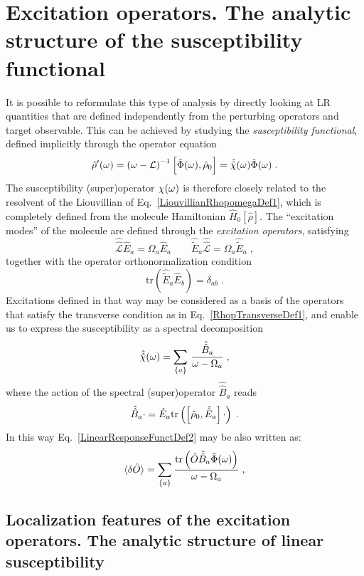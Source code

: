 \documentclass[reprint,aps,prb]{revtex4-1}
\newcommand{\be}{\begin{equation}}
\newcommand{\ee}{\end{equation}}
\newcommand{\nn}{\notag}
\newcommand{\qq}{\qquad}
\newcommand{\lb}{\label}
\newcommand{\op}[1]{\hat {#1}}
\newcommand{\sop}[1]{\op{\op {#1}}}
\newcommand{\commutator}[2]{\left[ {#1} , {#2} \right]}
\newcommand{\trace}[1]{\mathrm{tr}\left(#1\right)}
\newcommand{\dmnot}{\op{\rho}_0}
\newcommand{\dm}{\op{\rho}}
\newcommand{\hnot}{\op{H}_0}
\newcommand{\Liouv}{\sop{\mathcal L}}
\begin{document}
\section{Excitation operators. The analytic structure of the susceptibility functional}

It is possible to reformulate this type of analysis by directly looking at LR quantities that are defined independently from the perturbing operators and target observable. This can be achieved by studying the \emph{susceptibility functional}, defined implicitly through the operator equation
\be\lb{SusceptibilityDef1}
\dm'(\omega) = \left(\omega -\mathcal L \right)^{-1} \commutator{\op \Phi(\omega)}{\dmnot} = \sop{{\cal \chi}}(\omega) \op\Phi(\omega) \;.
\ee
The susceptibility (super)operator $\cal \chi(\omega)$ is therefore closely related to the resolvent of the Liouvillian of Eq.~\eqref{LiouvillianRhopomegaDef1}, which is completely defined
from the molecule Hamiltonian $\hnot[\dm]$.
The ``excitation modes''  of the molecule are defined through the \emph{excitation operators}, satisfying
\be\lb{ExcitationOperatorsDef1}
\Liouv \op E_a = \Omega_a \op E_a \qq \op{\tilde E}_a \Liouv = \Omega_a \op{\tilde E}_a \;,
\ee
together with the operator orthonormalization condition %
\be\lb{orthoExcitatioOpDef1}
\trace{\op{\tilde E}_a\op E_b} = \delta_{ab} \;.
\ee
Excitations defined in that way may be considered as a basis of the operators that satisfy the transverse condition as in
Eq.~\eqref{RhopTransverseDef1}, and enable us to express the susceptibility as a spectral decomposition
\be\lb{RhopExcitationDef1}
\sop{{\cal \chi}}(\omega) = \sum_{\{a\}} \,
\frac{\sop B_a}{\omega-\Omega_a} \;,
\ee
where the action of the spectral (super)operator $\sop B_a$ reads
\be\lb{spectralop}
  \sop B_a \cdot = \op E_a \trace{\commutator{\dmnot}{\op{\tilde E}_a} \cdot} \;. \nn
\ee
In this way Eq.~\eqref{LinearResponseFunctDef2} may be also written as:
\be\lb{deltaoexc}
  \braket{\delta \op O} =  \sum_{\{a\}} \frac{\trace{\op O \sop B_a \op \Phi(\omega)}}{\omega -\Omega_a}\;,
\ee


\subsection{Localization features of the excitation operators. The analytic structure of linear susceptibility}
\end{document}

